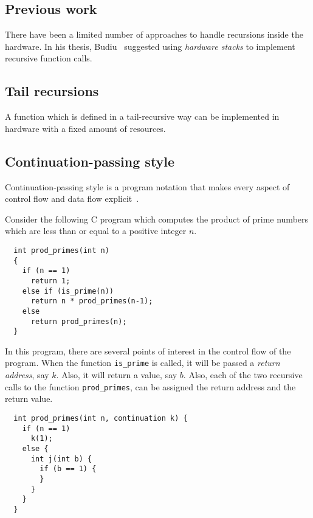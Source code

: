 \subsection{Previous work}
There have been a limited number of approaches to handle recursions inside the
hardware. In his thesis, Budiu~\cite{Budiu03} suggested using {\em hardware
  stacks\/} to implement recursive function calls. 


\subsection{Tail recursions}
A function which is defined in a tail-recursive way can be implemented in
hardware with a fixed amount of resources. 

\subsection{Continuation-passing style}\label{hwctrl:cps}
Continuation-passing style is a program notation that makes every aspect of
control flow and data flow explicit~\cite{Appel92}. 

Consider the following C program which computes the product of prime numbers
which are less than or equal to a positive integer $n$. 

\begin{verbatim}
  int prod_primes(int n) 
  {
    if (n == 1) 
      return 1;
    else if (is_prime(n))
      return n * prod_primes(n-1);
    else
      return prod_primes(n);
  }
\end{verbatim}
In this program, there are several points of interest in the control flow of
the program. When the function \verb+is_prime+ is called, it will be passed a
{\em return address\/}, say $k$. Also, it will return a value, say $b$. 
Also, each of the two recursive calls to the function \verb+prod_primes+, can
be assigned the return address and the return value. 


\begin{verbatim}
  int prod_primes(int n, continuation k) {
    if (n == 1)
      k(1);
    else {
      int j(int b) {
        if (b == 1) {
        }
      }
    }
  }
\end{verbatim}
